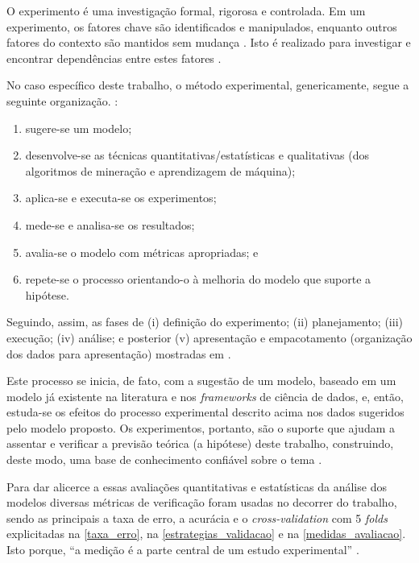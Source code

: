 \documentclass[
	12pt,				%
	openright,			%
	oneside,			%
	a4paper,			%
	english,			%
	french,				%
	spanish,			%
	brazil				%
	]{abntex2}
\begin{document}
O experimento é uma investigação formal, rigorosa e controlada. Em um experimento, os fatores chave são identificados e manipulados, enquanto outros fatores do contexto são mantidos sem mudança \cite[p. 11]{wohlin_experimentation_2000}. Isto é realizado para investigar e encontrar dependências entre estes fatores \cite[p. 63]{wazlawick2009} .

No caso específico deste trabalho, o método experimental, genericamente, segue a seguinte organização. \cite[p. 3]{travassos_introducao_2002}:
\begin{enumerate}
	\item sugere-se um modelo; 
	\item desenvolve-se as técnicas quantitativas/estatísticas e qualitativas (dos algoritmos de mineração e aprendizagem de máquina);
	\item aplica-se e executa-se os experimentos;
	\item mede-se e analisa-se os resultados;
	\item avalia-se o modelo com métricas apropriadas; e
	\item repete-se o processo orientando-o à melhoria do modelo que suporte a hipótese.
\end{enumerate}

Seguindo, assim, as fases de (i) definição do experimento; (ii) planejamento; (iii) execução; (iv) análise; e posterior (v) apresentação e empacotamento (organização dos dados para apresentação) mostradas em .

Este processo se inicia, de fato, com a sugestão de um modelo, baseado em um modelo já existente na literatura e nos \textit{frameworks} de ciência de dados, e, então, estuda-se os efeitos do processo experimental descrito acima nos dados sugeridos pelo modelo proposto. Os experimentos, portanto, são o suporte que ajudam a assentar e verificar a previsão teórica (a hipótese) deste trabalho, construindo, deste modo, uma base de conhecimento confiável sobre o tema \cite[p. 3 e 4]{travassos_introducao_2002}.

Para dar alicerce a essas avaliações quantitativas e estatísticas da análise dos modelos diversas métricas de verificação foram usadas no decorrer do trabalho, sendo as principais a taxa de erro, a acurácia e o \textit{cross-validation} com 5 \textit{folds} explicitadas na \autoref{taxa_erro}, na \autoref{estrategias_validacao} e na \autoref{medidas_avaliacao}. Isto porque, ``a medição é a parte central de um estudo experimental'' \cite[p. 10]{travassos_introducao_2002}. 
\end{document}
